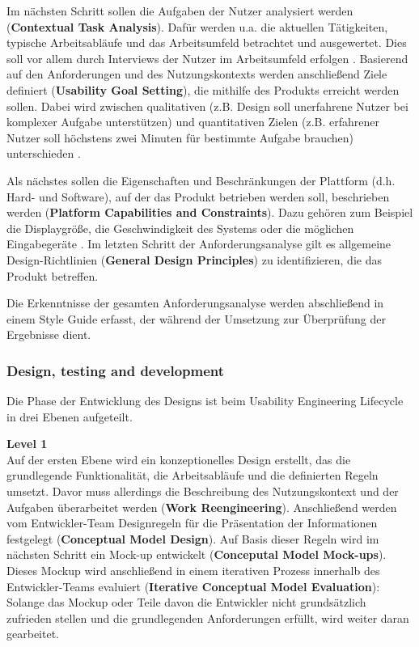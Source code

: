 \documentclass[utf8,biblatex]{lni}
\begin{document}
Im nächsten Schritt sollen die Aufgaben der Nutzer analysiert werden (\textbf{Contextual Task Analysis}). Dafür werden u.a. die aktuellen Tätigkeiten, typische Arbeitsabläufe und das Arbeitsumfeld betrachtet und ausgewertet. Dies soll vor allem durch Interviews der Nutzer im Arbeitsumfeld erfolgen \cite[69]{Mayhew.2010}. Basierend auf den Anforderungen und des Nutzungskontexts werden anschließend Ziele definiert (\textbf{Usability Goal Setting}), die mithilfe des Produkts erreicht werden sollen. Dabei wird zwischen qualitativen (z.B. Design soll unerfahrene Nutzer bei komplexer Aufgabe unterstützen) und quantitativen Zielen (z.B. erfahrener Nutzer soll höchstens zwei Minuten für bestimmte Aufgabe brauchen) unterschieden \cite[126\psq]{Mayhew.2010}.

Als nächstes sollen die Eigenschaften und Beschränkungen der Plattform (d.h. Hard- und Software), auf der das Produkt betrieben werden soll, beschrieben werden (\textbf{Platform Capabilities and Constraints}). Dazu gehören zum Beispiel die Displaygröße, die Geschwindigkeit des Systems oder die möglichen Eingabegeräte \cite[147]{Mayhew.2010}. Im letzten Schritt der Anforderungsanalyse gilt es allgemeine Design-Richtlinien (\textbf{General Design Principles}) zu identifizieren, die das Produkt betreffen. 

Die Erkenntnisse der gesamten Anforderungsanalyse werden abschließend in einem Style Guide erfasst, der während der Umsetzung zur Überprüfung der Ergebnisse dient.


\subsubsection{Design, testing and development}
Die Phase der Entwicklung des Designs ist beim Usability Engineering Lifecycle in drei Ebenen aufgeteilt. 

\textbf{Level 1}\\
Auf der ersten Ebene wird ein konzeptionelles Design erstellt, das die grundlegende Funktionalität, die Arbeitsabläufe und die definierten Regeln umsetzt. Davor muss allerdings die Beschreibung des Nutzungskontext und der Aufgaben überarbeitet werden (\textbf{Work Reengineering}). Anschließend werden vom Entwickler-Team Designregeln für die Präsentation der Informationen festgelegt (\textbf{Conceptual Model Design}). Auf Basis dieser Regeln wird im nächsten Schritt ein Mock-up entwickelt (\textbf{Conceputal Model Mock-ups}). Dieses Mockup wird anschließend in einem iterativen Prozess innerhalb des Entwickler-Teams evaluiert (\textbf{Iterative Conceptual Model Evaluation}): Solange das Mockup oder Teile davon die Entwickler nicht grundsätzlich zufrieden stellen und die grundlegenden Anforderungen erfüllt, wird weiter daran gearbeitet. 
\end{document}
